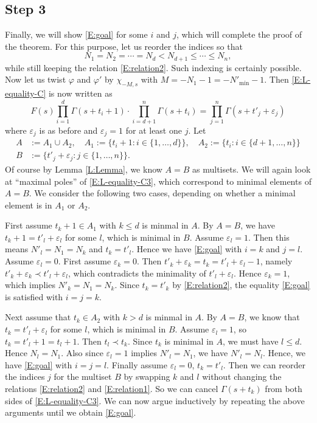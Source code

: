 \documentclass[11pt]{amsart}
\theoremstyle{plain}
\theoremstyle{definition}
\numberwithin{equation}{section}
\newcommand{\ep}{\varepsilon}
\newcommand{\ie}{\text{i.e.\ }}
\begin{document}
\subsection{Step 3}
Finally, we will show \eqref{E:goal} for some $i$ and $j$, which will
complete the proof of the theorem. For this
purpose, let us reorder the indices so that 
\begin{equation}\label{E:relation1}
N_1=N_2=\cdots=N_d<N_{d+1}\leq\cdots\leq N_n,
\end{equation}
while still keeping the relation \eqref{E:relation2}. Such indexing is
certainly possible. Now let us twist $\varphi$ and $\varphi'$ by $\chi_{-M,s}$ with
$M=-N_1-1=-N'_{\min}-1$. Then \eqref{E:L-equality-C} is now written as
\begin{equation}\label{E:L-equality-C3}
F(s)\prod_{i=1}^d\Gamma(s+t_i+1)\cdot\prod_{i=d+1}^n\Gamma(s+t_i)
=\prod_{j=1}^n\Gamma(s+t'_j+\ep_j)
\end{equation}
where $\ep_j$ is as before and $\ep_j=1$ for at least one $j$. Let
\begin{align*}
A&:=A_1\cup A_2, \quad A_1:=\{t_i+1:i\in\{1,\dots,d\}\},\quad A_2:=\{t_i:i\in\{d+1,\dots,n\}\}\\
B&:=\{t'_j+\ep_j: j\in\{1,\dots,n\}\}.
\end{align*}
Of course by Lemma \ref{L:Lemma}, we know $A=B$ as multisets. 
We will again look at ``maximal poles'' of
\eqref{E:L-equality-C3}, which correspond to minimal elements of $A=B$.
We consider
the following two cases, depending on whether a minimal element is in
$A_1$ or $A_2$.

First assume $t_k+1\in A_1$ with $k\leq d$ is minmal in
$A$. By $A=B$, we have $t_k+1=t'_l+\ep_l$ for some $l$, which is
minimal in $B$. Assume $\ep_l=1$. Then this
means $N'_l=N_1=N_k$ and $t_k=t'_l$. Hence we have
\eqref{E:goal} with $i=k$ and $j=l$. Assume $\ep_l=0$. First assume $\ep_k=0$. Then
$t'_k+\ep_k=t_k=t'_l+\ep_l-1$, namely $t'_k+\ep_k\prec
t'_l+\ep_l$, which contradicts the minimality of
$t'_l+\ep_l$. Hence $\ep_k=1$, which implies $N'_k=N_1=N_k$. Since
$t_k=t'_k$ by \eqref{E:relation2}, the equality \eqref{E:goal} is satisfied with $i=j=k$.

Next assume that $t_k\in A_2$ with $k>d$ is minmal in
$A$. By $A=B$,
we know that $t_k=t'_l+\ep_l$ for some $l$, which is minimal in
$B$. Assume $\ep_l=1$, so $t_k=t'_l+1=t_l+1$. Then
$t_l\prec t_k$. Since $t_k$ is minimal in
$A$, we must have $l\leq d$. Hence
$N_l=N_1$. Also since $\ep_l=1$ implies $N'_l=N_1$, we have
$N'_l=N_l$. Hence, we have
\eqref{E:goal} with $i=j=l$. Finally assume 
$\ep_l=0$, \ie $t_k=t'_l$. Then we
can reorder the indices $j$ for the multiset $B$ by swapping $k$ and
$l$ without changing the relations \eqref{E:relation2} and
\eqref{E:relation1}. So we can cancel $\Gamma(s+t_k)$ from both
sides of \eqref{E:L-equality-C3}. We can now argue
inductively by repeating the above arguments until we obtain
\eqref{E:goal}.
\end{document}
